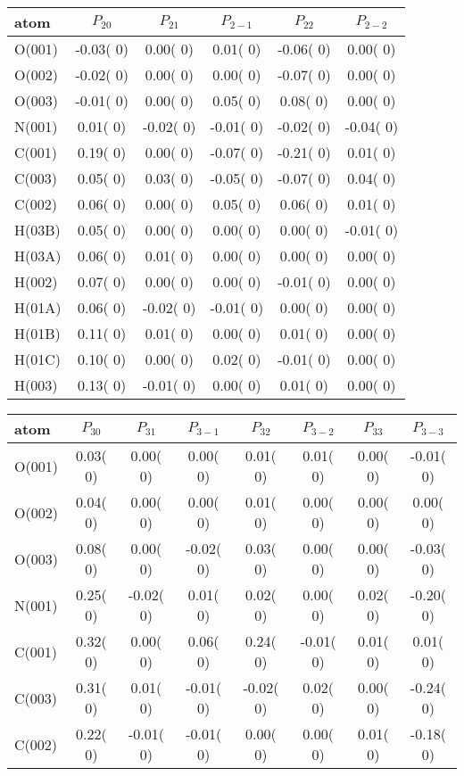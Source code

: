 \documentclass[a4]{article}
\begin{document}
 \begin{tabular}{||l|c|c|c|c|c||}\hline
 atom & $P_{20}$
  & $P_{21}$ & $P_{2-1}$ & $P_{22}$ & $P_{2-2}$
  \\ \hline
O(001)  
 & -0.03( 0) &  0.00( 0) &  0.01( 0) & -0.06( 0) &  0.00( 0) \\
O(002)  
 & -0.02( 0) &  0.00( 0) &  0.00( 0) & -0.07( 0) &  0.00( 0) \\
O(003)  
 & -0.01( 0) &  0.00( 0) &  0.05( 0) &  0.08( 0) &  0.00( 0) \\
N(001)  
 &  0.01( 0) & -0.02( 0) & -0.01( 0) & -0.02( 0) & -0.04( 0) \\
C(001)  
 &  0.19( 0) &  0.00( 0) & -0.07( 0) & -0.21( 0) &  0.01( 0) \\
C(003)  
 &  0.05( 0) &  0.03( 0) & -0.05( 0) & -0.07( 0) &  0.04( 0) \\
C(002)  
 &  0.06( 0) &  0.00( 0) &  0.05( 0) &  0.06( 0) &  0.01( 0) \\
H(03B)  
 &  0.05( 0) &  0.00( 0) &  0.00( 0) &  0.00( 0) & -0.01( 0) \\
H(03A)  
 &  0.06( 0) &  0.01( 0) &  0.00( 0) &  0.00( 0) &  0.00( 0) \\
H(002)  
 &  0.07( 0) &  0.00( 0) &  0.00( 0) & -0.01( 0) &  0.00( 0) \\
H(01A)  
 &  0.06( 0) & -0.02( 0) & -0.01( 0) &  0.00( 0) &  0.00( 0) \\
H(01B)  
 &  0.11( 0) &  0.01( 0) &  0.00( 0) &  0.01( 0) &  0.00( 0) \\
H(01C)  
 &  0.10( 0) &  0.00( 0) &  0.02( 0) & -0.01( 0) &  0.00( 0) \\
H(003)  
 &  0.13( 0) & -0.01( 0) &  0.00( 0) &  0.01( 0) &  0.00( 0) \\
 \hline
 \end{tabular}
 
 \vspace{2.0 cm}
 
 \begin{tabular}{||l|c|c|c|c|c|c|c||} \hline
 atom & $P_{30}$
  & $P_{31}$ & $P_{3-1}$ & $P_{32}$ & $P_{3-2}$
  & $P_{33}$ & $P_{3-3}$
  \\ \hline
O(001)  
 &  0.03( 0) &  0.00( 0) &  0.00( 0) &  0.01( 0) &  0.01( 0) &  0.00( 0) & -0.01( 0) \\
O(002)  
 &  0.04( 0) &  0.00( 0) &  0.00( 0) &  0.01( 0) &  0.00( 0) &  0.00( 0) &  0.00( 0) \\
O(003)  
 &  0.08( 0) &  0.00( 0) & -0.02( 0) &  0.03( 0) &  0.00( 0) &  0.00( 0) & -0.03( 0) \\
N(001)  
 &  0.25( 0) & -0.02( 0) &  0.01( 0) &  0.02( 0) &  0.00( 0) &  0.02( 0) & -0.20( 0) \\
C(001)  
 &  0.32( 0) &  0.00( 0) &  0.06( 0) &  0.24( 0) & -0.01( 0) &  0.01( 0) &  0.01( 0) \\
C(003)  
 &  0.31( 0) &  0.01( 0) & -0.01( 0) & -0.02( 0) &  0.02( 0) &  0.00( 0) & -0.24( 0) \\
C(002)  
 &  0.22( 0) & -0.01( 0) & -0.01( 0) &  0.00( 0) &  0.00( 0) &  0.01( 0) & -0.18( 0) \\
 \hline
 \end{tabular}
 
\end{document}
